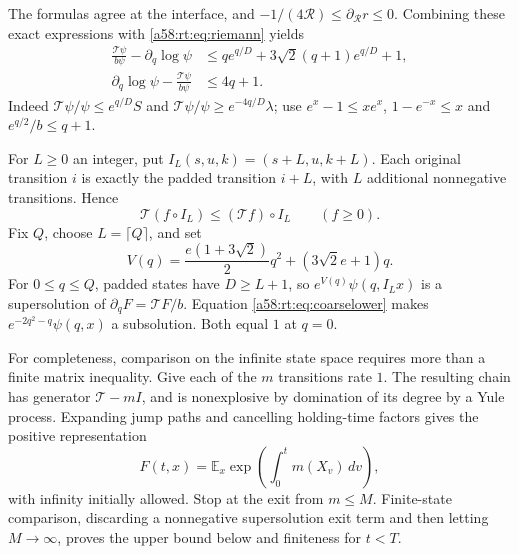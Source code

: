\documentclass[11pt,letterpaper]{article}
\theoremstyle{remark}
\newcommand{\TT}{\mathcal T}
\newcommand{\E}{\mathbb E}
\newcommand{\dd}{\,d}
\begin{document}
The formulas agree at the interface, and
$-1/(4\mathcal R)\le\partial_{\mathcal R}r\le0$.
Combining these exact expressions with \eqref{a58:rt:eq:riemann} yields
\begin{align}
 \frac{\TT\psi}{b\psi}-\partial_q\log\psi
 &\le q e^{q/D}+3\sqrt2(q+1)e^{q/D}+1,\label{a58:rt:eq:coarseupper}\\
 \partial_q\log\psi-\frac{\TT\psi}{b\psi}
 &\le4q+1.\label{a58:rt:eq:coarselower}
\end{align}
Indeed $\TT\psi/\psi\le e^{q/D}S$ and
$\TT\psi/\psi\ge e^{-4q/D}\lambda$; use
$e^x-1\le xe^x$, $1-e^{-x}\le x$ and $e^{q/2}/b\le q+1$.

For $L\ge0$ an integer, put $I_L(s,u,k)=(s+L,u,k+L)$.
Each original transition $i$ is exactly the padded transition $i+L$,
with $L$ additional nonnegative transitions. Hence
\begin{equation}\label{a58:rt:eq:padding}
 \TT(f\circ I_L)\le(\TT f)\circ I_L\qquad(f\ge0).
\end{equation}
Fix $Q$, choose $L=\lceil Q\rceil$, and set
\[
 V(q)=\frac{e(1+3\sqrt2)}2q^2+(3\sqrt2e+1)q.
\]
For $0\le q\le Q$, padded states have $D\ge L+1$, so
$e^{V(q)}\psi(q,I_Lx)$ is a supersolution of $\partial_qF=\TT F/b$.
Equation \eqref{a58:rt:eq:coarselower} makes
$e^{-2q^2-q}\psi(q,x)$ a subsolution. Both equal $1$ at $q=0$.

For completeness, comparison on the infinite state space requires more
than a finite matrix inequality. Give each of the $m$ transitions rate
$1$. The resulting chain has generator $\TT-mI$, and is nonexplosive
by domination of its degree by a Yule process. Expanding jump paths and
cancelling holding-time factors gives the positive representation
\begin{equation}\label{a58:rt:eq:fk}
 F(t,x)=\E_x\exp\left(\int_0^t m(X_v)\dd v\right),
\end{equation}
with infinity initially allowed. Stop at the exit from $m\le M$.
Finite-state comparison, discarding a nonnegative supersolution exit
term and then letting $M\to\infty$, proves the upper bound below and
finiteness for $t<T$.
\end{document}
